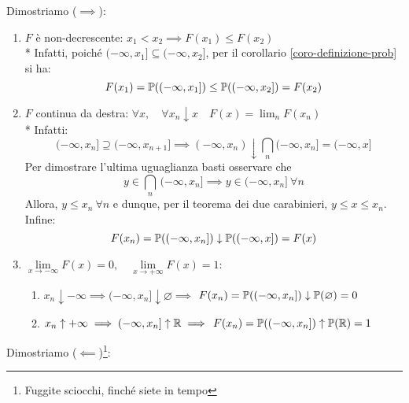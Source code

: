 \begin{dimo}
  Dimostriamo ($\implies$):
  \begin{enumerate}
    \item $F$ è non-decrescente: $x_1 < x_2 \implies F(x_1) \leq F(x_2)$ \\*
      Infatti, poiché $(-\infty, x_1] \subseteq (-\infty, x_2]$, per il corollario \ref{coro-definizione-prob} si ha:
      $$F(x_1) = \mathbb P((-\infty, x_1]) \leq \mathbb P((-\infty, x_2]) = F(x_2)$$
    \item $F$ continua da destra: $\forall x, \quad \forall x_n \downarrow x \quad F(x) = \lim_{n} F(x_n)$\\*
      Infatti:
      $$(-\infty, x_n] \supseteq (-\infty, x_{n+1}] \implies (-\infty, x_n) \downarrow \bigcap\limits_n (-\infty, x_n] = (-\infty, x]$$
      Per dimostrare l'ultima uguaglianza basti osservare che
      $$y \in \bigcap\limits_n \, (-\infty, x_n] \implies y \in (-\infty, x_n] \ \forall n$$
      Allora, $y \leq x_n \  \forall n$ e dunque, per il teorema dei due carabinieri, $y \leq x \leq x_n$. \\
      Infine:
      $$F(x_n) = \mathbb P((-\infty, x_n]) \downarrow \mathbb P((-\infty, x]) = F(x)$$
    \item $\lim\limits_{x \to -\infty} F(x) = 0, \quad \lim\limits_{x \to +\infty} F(x) = 1$:
      \begin{enumerate}
        \item $x_n \downarrow -\infty \implies (-\infty, x_n] \downarrow \varnothing \implies$
          $F(x_n) = \mathbb P((-\infty, x_n]) \downarrow \mathbb P(\varnothing) = 0$
        \item $x_n \uparrow +\infty \implies (-\infty, x_n] \uparrow \mathbb R \implies$
          $F(x_n) = \mathbb P((-\infty, x_n]) \uparrow \mathbb P(\mathbb R) = 1$
      \end{enumerate}
  \end{enumerate}
  \medskip

  Dimostriamo ($\impliedby$)\footnote{Fuggite sciocchi, finché siete in tempo}:


\end{dimo}
